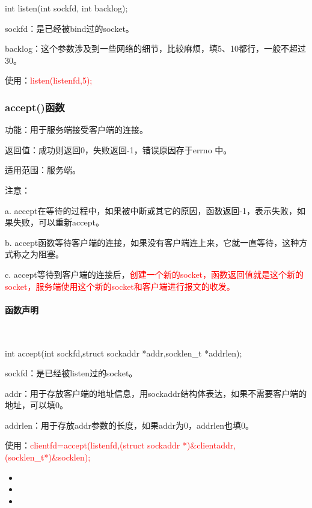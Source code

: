 \documentclass[UTF8]{article}%
\begin{document}
int listen(int sockfd, int backlog);

sockfd：是已经被bind过的socket。

backlog：这个参数涉及到一些网络的细节，比较麻烦，填5、10都行，一般不超过30。

使用：\textcolor{red}{listen(listenfd,5);}

\subsubsection{accept()函数}

功能：用于服务端接受客户端的连接。

返回值：成功则返回0，失败返回-1，错误原因存于errno 中。

适用范围：服务端。

注意：

a. accept在等待的过程中，如果被中断或其它的原因，函数返回-1，表示失败，如果失败，可以重新accept。

b. accept函数等待客户端的连接，如果没有客户端连上来，它就一直等待，这种方式称之为阻塞。

c. accept等待到客户端的连接后，\textcolor{red}{创建一个新的socket，函数返回值就是这个新的socket，服务端使用这个新的socket和客户端进行报文的收发。}

\paragraph{函数声明}~{}

int accept(int sockfd,struct sockaddr *addr,socklen\_t *addrlen);

sockfd：是已经被listen过的socket。

addr：用于存放客户端的地址信息，用sockaddr结构体表达，如果不需要客户端的地址，可以填0。

addrlen：用于存放addr参数的长度，如果addr为0，addrlen也填0。

使用：\textcolor{red}{clientfd=accept(listenfd,(struct sockaddr *)\&clientaddr,(socklen\_t*)\&socklen);}

\begin{itemize}
    \item 
    \item 
    \item 
\end{itemize}
\end{document}
